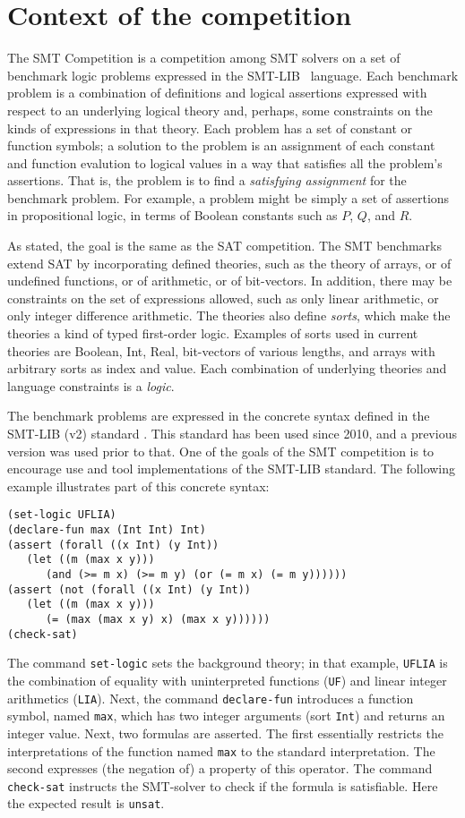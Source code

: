 \documentclass[twosize,11pt]{article}
\begin{document}
\section{Context of the competition}
\label{sec:context}

The SMT Competition is a competition among SMT solvers on a set of benchmark logic problems expressed in the SMT-LIB~\cite{BarST-RR-10} language. Each benchmark problem is a combination of definitions and logical assertions expressed with respect to an underlying logical theory and, perhaps, some constraints on the kinds of expressions in that theory. Each problem has a set of constant or function symbols; a solution to the problem is an assignment of each constant and function evalution to logical values in a way that satisfies all the problem's assertions. That is, the problem is to find a \textit{satisfying assignment} for the benchmark problem. For example, a problem might be simply a set of assertions in 
propositional logic, in terms of Boolean constants such as $P$, $Q$, and $R$.

As stated, the goal is the same as the SAT competition. The SMT benchmarks extend SAT by incorporating defined theories, such as the theory of arrays, or of undefined functions, or of arithmetic, or of bit-vectors. In addition, there may be constraints on the set of expressions allowed, such as only linear arithmetic, or only integer difference arithmetic. The theories also define \textit{sorts}, which make the theories a kind of typed first-order logic. Examples of sorts used in current theories are Boolean, Int, Real, bit-vectors of various lengths, and arrays with arbitrary sorts as index and value. Each combination of underlying theories and language constraints is a \textit{logic}.

The benchmark problems are expressed in the concrete syntax defined in the SMT-LIB (v2) standard \cite{BarST-RR-10}. This standard has been used since 2010, and a previous version was used prior to that. One of the goals of the SMT competition is to encourage use and tool implementations of the SMT-LIB standard. The following example illustrates part of this concrete syntax:
\begin{verbatim}
(set-logic UFLIA)
(declare-fun max (Int Int) Int)
(assert (forall ((x Int) (y Int))
   (let ((m (max x y)))
      (and (>= m x) (>= m y) (or (= m x) (= m y))))))
(assert (not (forall ((x Int) (y Int))
   (let ((m (max x y)))
      (= (max (max x y) x) (max x y))))))
(check-sat)
\end{verbatim}
The command \verb'set-logic' sets the background theory; in that
example, \verb'UFLIA' is the combination of equality with uninterpreted
functions (\verb'UF') and linear integer arithmetics
(\verb'LIA'). Next, the command \verb'declare-fun' introduces a
function symbol, named \verb'max', which has two integer arguments
(sort \verb'Int') and returns an integer value. Next, two formulas are
asserted. The first essentially restricts the interpretations of the
function named \verb'max' to the standard interpretation. The second
expresses (the negation of) a property of this operator. The command
\verb'check-sat' instructs the SMT-solver to check if the formula is
satisfiable. Here the expected result is \verb'unsat'.
\end{document}
